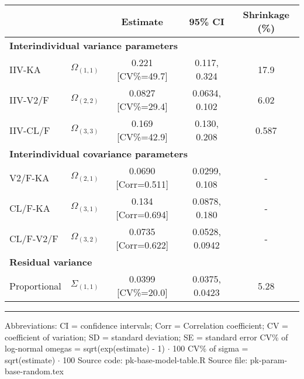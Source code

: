 \setlength{\tabcolsep}{5pt} 
\begin{threeparttable}
\renewcommand{\arraystretch}{1.3}
\begin{tabular}[h]{lcccc}
\hline
 &  & Estimate & 95\% CI & Shrinkage (\%) \\
\hline
\multicolumn{5}{l}{\textbf{Interindividual variance parameters}}\\%
IIV-KA & $\Omega_{(1,1)}$ & 0.221 [CV\%=49.7] & 0.117, 0.324 & 17.9 \\
IIV-V2/F & $\Omega_{(2,2)}$ & 0.0827 [CV\%=29.4] & 0.0634, 0.102 & 6.02 \\
IIV-CL/F & $\Omega_{(3,3)}$ & 0.169 [CV\%=42.9] & 0.130, 0.208 & 0.587 \\
\hline \multicolumn{5}{l}{\textbf{Interindividual covariance parameters}}\\%
V2/F-KA & $\Omega_{(2,1)}$ & 0.0690 [Corr=0.511] & 0.0299, 0.108 & - \\
CL/F-KA & $\Omega_{(3,1)}$ & 0.134 [Corr=0.694] & 0.0878, 0.180 & - \\
CL/F-V2/F & $\Omega_{(3,2)}$ & 0.0735 [Corr=0.622] & 0.0528, 0.0942 & - \\
\hline \multicolumn{5}{l}{\textbf{Residual variance}}\\%
Proportional & $\Sigma_{(1,1)}$ & 0.0399 [CV\%=20.0] & 0.0375, 0.0423 & 5.28 \\
\hline
\end{tabular}
\end{threeparttable}
\vskip 0.67cm
\begin{minipage}{1\linewidth}
\linespread{1.1}\selectfont
\rule{1\linewidth}{0.4pt}
\vskip 0.02cm
Abbreviations: CI = confidence intervals; 
                        Corr = Correlation coefficient;
                        CV = coefficient of variation;
                        SD = standard deviation;
                        SE = standard error \newline
CV\% of log-normal omegas = sqrt(exp(estimate) - 1) $\cdot$ 100 \newline
CV\% of sigma = sqrt(estimate) $\cdot$ 100 \newline
Source code: pk-base-model-table.R \newline
Source file: pk-param-base-random.tex \newline
\end{minipage}
